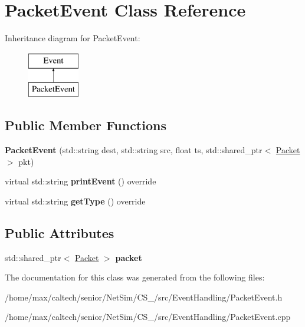 \hypertarget{classPacketEvent}{\section{\-Packet\-Event \-Class \-Reference}
\label{classPacketEvent}
}
\-Inheritance diagram for \-Packet\-Event\-:\begin{figure}[H]
\begin{center}
\leavevmode
\includegraphics[height=2.000000cm]{classPacketEvent}
\end{center}
\end{figure}
\subsection*{\-Public \-Member \-Functions}
\begin{DoxyCompactItemize}
\item 
\hypertarget{classPacketEvent_a25509c37d21207e1150aa9032eca1a57}{{\bfseries \-Packet\-Event} (std\-::string dest, std\-::string src, float ts, std\-::shared\-\_\-ptr$<$ \hyperlink{classPacket}{\-Packet} $>$ pkt)}\label{classPacketEvent_a25509c37d21207e1150aa9032eca1a57}

\item 
\hypertarget{classPacketEvent_a71221422c26683393ef3a58784f526ff}{virtual std\-::string {\bfseries print\-Event} () override}\label{classPacketEvent_a71221422c26683393ef3a58784f526ff}

\item 
\hypertarget{classPacketEvent_a7dfa4c479200db12df64a12bc39d22d8}{virtual std\-::string {\bfseries get\-Type} () override}\label{classPacketEvent_a7dfa4c479200db12df64a12bc39d22d8}

\end{DoxyCompactItemize}
\subsection*{\-Public \-Attributes}
\begin{DoxyCompactItemize}
\item 
\hypertarget{classPacketEvent_ac3390dfb095c14e0b5c078b51dd914cf}{std\-::shared\-\_\-ptr$<$ \hyperlink{classPacket}{\-Packet} $>$ {\bfseries packet}}\label{classPacketEvent_ac3390dfb095c14e0b5c078b51dd914cf}

\end{DoxyCompactItemize}


\-The documentation for this class was generated from the following files\-:\begin{DoxyCompactItemize}
\item 
/home/max/caltech/senior/\-Net\-Sim/\-C\-S\-\_/src/\-Event\-Handling/\-Packet\-Event.\-h\item 
/home/max/caltech/senior/\-Net\-Sim/\-C\-S\-\_/src/\-Event\-Handling/\-Packet\-Event.\-cpp\end{DoxyCompactItemize}
